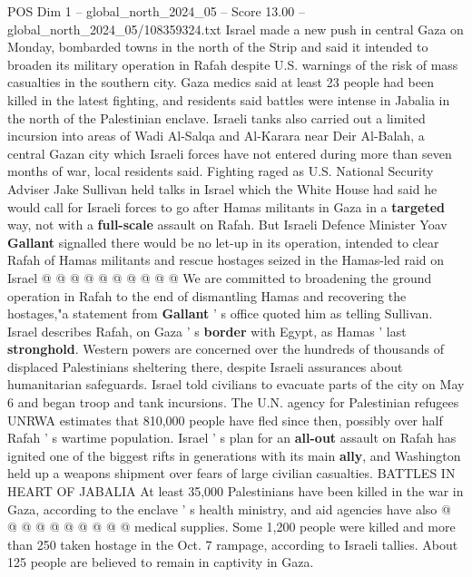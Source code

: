 \begin{textsample}{POS Dim 1 – global\_north\_2024\_05 – Score 13.00 – global\_north\_2024\_05/108359324.txt}  \label{ex:f1_pos_409}
Israel made a new push in central Gaza on Monday, bombarded towns in the north of the Strip and said it intended to broaden its military operation in Rafah despite U.S. warnings of the risk of mass casualties in the southern city.
Gaza medics said at least 23 people had been killed in the latest fighting, and residents said battles were intense in Jabalia in the north of the Palestinian enclave.
Israeli tanks also carried out a limited incursion into areas of Wadi Al-Salqa and Al-Karara near Deir Al-Balah, a central Gazan city which Israeli forces have not entered during more than seven months of war, local residents said.
Fighting raged as U.S.
National Security Adviser Jake Sullivan held talks in Israel which the White House had said he would call for Israeli forces to go after Hamas militants in Gaza in a \textbf{targeted} way, not with a \textbf{full-scale} assault on Rafah.
But Israeli Defence Minister Yoav \textbf{Gallant} signalled there would be no let-up in its operation, intended to clear Rafah of Hamas militants and rescue hostages seized in the Hamas-led raid on Israel @ @ @ @ @ @ @ @ @ @ We are committed to broadening the ground operation in Rafah to the end of dismantling Hamas and recovering the hostages,"a statement from \textbf{Gallant} ' s office quoted him as telling Sullivan.
Israel describes Rafah, on Gaza ' s \textbf{border} with Egypt, as Hamas ' last \textbf{stronghold}.
Western powers are concerned over the hundreds of thousands of displaced Palestinians sheltering there, despite Israeli assurances about humanitarian safeguards.
Israel told civilians to evacuate parts of the city on May 6 and began troop and tank incursions.
The U.N. agency for Palestinian refugees UNRWA estimates that 810,000 people have fled since then, possibly over half Rafah ' s wartime population.
Israel ' s plan for an \textbf{all-out} assault on Rafah has ignited one of the biggest rifts in generations with its main \textbf{ally}, and Washington held up a weapons shipment over fears of large civilian casualties.
BATTLES IN HEART OF JABALIA At least 35,000 Palestinians have been killed in the war in Gaza, according to the enclave ' s health ministry, and aid agencies have also @ @ @ @ @ @ @ @ @ @ medical supplies.
Some 1,200 people were killed and more than 250 taken hostage in the Oct. 7 rampage, according to Israeli tallies.
About 125 people are believed to remain in captivity in Gaza.

\end{textsample}
